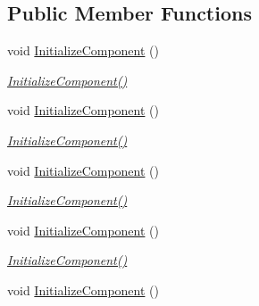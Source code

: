 \subsection*{Public Member Functions}
\begin{DoxyCompactItemize}
\item 
void \mbox{\hyperlink{class_r_f_storage_1_1_view_1_1_organisation_1_1_organisation_liste_udlevering_v_a696d504863e3dfaefd07879d4224ce2e}{Initialize\+Component}} ()
\begin{DoxyCompactList}\small\item\em \mbox{\hyperlink{class_r_f_storage_1_1_view_1_1_organisation_1_1_organisation_liste_udlevering_v_a696d504863e3dfaefd07879d4224ce2e}{Initialize\+Component()}} \end{DoxyCompactList}\item 
void \mbox{\hyperlink{class_r_f_storage_1_1_view_1_1_organisation_1_1_organisation_liste_udlevering_v_a696d504863e3dfaefd07879d4224ce2e}{Initialize\+Component}} ()
\begin{DoxyCompactList}\small\item\em \mbox{\hyperlink{class_r_f_storage_1_1_view_1_1_organisation_1_1_organisation_liste_udlevering_v_a696d504863e3dfaefd07879d4224ce2e}{Initialize\+Component()}} \end{DoxyCompactList}\item 
void \mbox{\hyperlink{class_r_f_storage_1_1_view_1_1_organisation_1_1_organisation_liste_udlevering_v_a696d504863e3dfaefd07879d4224ce2e}{Initialize\+Component}} ()
\begin{DoxyCompactList}\small\item\em \mbox{\hyperlink{class_r_f_storage_1_1_view_1_1_organisation_1_1_organisation_liste_udlevering_v_a696d504863e3dfaefd07879d4224ce2e}{Initialize\+Component()}} \end{DoxyCompactList}\item 
void \mbox{\hyperlink{class_r_f_storage_1_1_view_1_1_organisation_1_1_organisation_liste_udlevering_v_a696d504863e3dfaefd07879d4224ce2e}{Initialize\+Component}} ()
\begin{DoxyCompactList}\small\item\em \mbox{\hyperlink{class_r_f_storage_1_1_view_1_1_organisation_1_1_organisation_liste_udlevering_v_a696d504863e3dfaefd07879d4224ce2e}{Initialize\+Component()}} \end{DoxyCompactList}\item 
void \mbox{\hyperlink{class_r_f_storage_1_1_view_1_1_organisation_1_1_organisation_liste_udlevering_v_a696d504863e3dfaefd07879d4224ce2e}{Initialize\+Component}} ()

\end{DoxyCompactItemize}
